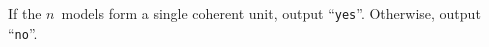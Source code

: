 
  If the $n$~models form a single coherent unit, output ``\texttt{yes}''.
  Otherwise, output ``\texttt{no}''.
